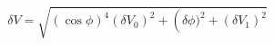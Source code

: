\begin{equation}
\label{eq:delta_V_Malus}
\delta V = \sqrt{ \left(\cos{\phi}\right)^4(\delta V_0)^2 + \left(\delta \phi)^2+ (\delta V_1)^2}
\end{equation}